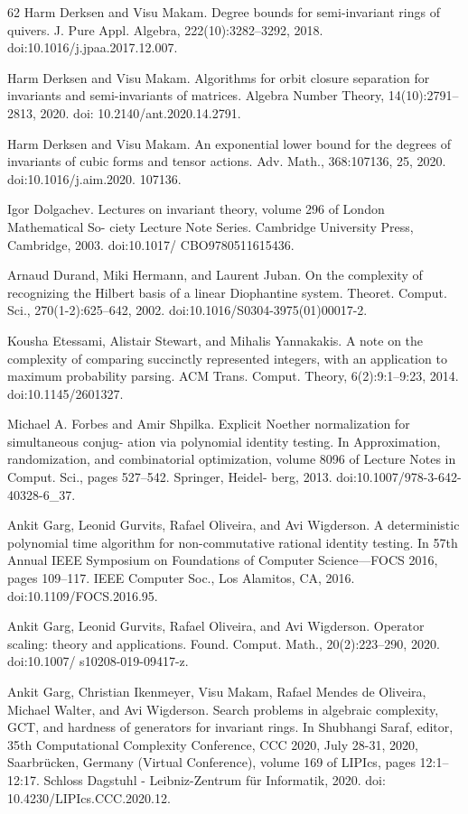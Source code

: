 \begin{thebibliography}{62}
Harm Derksen and Visu Makam. Degree bounds for semi-invariant rings of quivers. J. Pure Appl. Algebra, 222(10):3282–3292, 2018. doi:10.1016/j.jpaa.2017.12.007.

Harm Derksen and Visu Makam. Algorithms for orbit closure separation for invariants and semi-invariants of matrices. Algebra Number Theory, 14(10):2791–2813, 2020. doi: 10.2140/ant.2020.14.2791.

Harm Derksen and Visu Makam. An exponential lower bound for the degrees of invariants of cubic forms and tensor actions. Adv. Math., 368:107136, 25, 2020. doi:10.1016/j.aim.2020. 107136.

Igor Dolgachev. Lectures on invariant theory, volume 296 of London Mathematical So- ciety Lecture Note Series. Cambridge University Press, Cambridge, 2003. doi:10.1017/ CBO9780511615436.

Arnaud Durand, Miki Hermann, and Laurent Juban. On the complexity of recognizing the Hilbert basis of a linear Diophantine system. Theoret. Comput. Sci., 270(1-2):625–642, 2002. doi:10.1016/S0304-3975(01)00017-2.

Kousha Etessami, Alistair Stewart, and Mihalis Yannakakis. A note on the complexity of comparing succinctly represented integers, with an application to maximum probability parsing. ACM Trans. Comput. Theory, 6(2):9:1–9:23, 2014. doi:10.1145/2601327.

Michael A. Forbes and Amir Shpilka. Explicit Noether normalization for simultaneous conjug- ation via polynomial identity testing. In Approximation, randomization, and combinatorial optimization, volume 8096 of Lecture Notes in Comput. Sci., pages 527–542. Springer, Heidel- berg, 2013. doi:10.1007/978-3-642-40328-6\_37.

Ankit Garg, Leonid Gurvits, Rafael Oliveira, and Avi Wigderson. A deterministic polynomial time algorithm for non-commutative rational identity testing. In 57th Annual IEEE Symposium on Foundations of Computer Science—FOCS 2016, pages 109–117. IEEE Computer Soc., Los Alamitos, CA, 2016. doi:10.1109/FOCS.2016.95.

Ankit Garg, Leonid Gurvits, Rafael Oliveira, and Avi Wigderson. Operator scaling: theory and applications. Found. Comput. Math., 20(2):223–290, 2020. doi:10.1007/ s10208-019-09417-z.

Ankit Garg, Christian Ikenmeyer, Visu Makam, Rafael Mendes de Oliveira, Michael Walter, and Avi Wigderson. Search problems in algebraic complexity, GCT, and hardness of generators for invariant rings. In Shubhangi Saraf, editor, 35th Computational Complexity Conference, CCC 2020, July 28-31, 2020, Saarbrücken, Germany (Virtual Conference), volume 169 of LIPIcs, pages 12:1–12:17. Schloss Dagstuhl - Leibniz-Zentrum für Informatik, 2020. doi: 10.4230/LIPIcs.CCC.2020.12.


\end{thebibliography}
